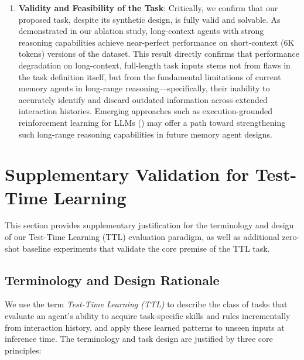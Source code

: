 \begin{enumerate}
    \item \textbf{Validity and Feasibility of the Task}: Critically, we confirm that our proposed task, despite its synthetic design, is fully valid and solvable. As demonstrated in our ablation study, long-context agents with strong reasoning capabilities achieve near-perfect performance on short-context (6K tokens) versions of the dataset. This result directly confirms that performance degradation on long-context, full-length task inputs stems not from flaws in the task definition itself, but from the fundamental limitations of current memory agents in long-range reasoning—specifically, their inability to accurately identify and discard outdated information across extended interaction histories. Emerging approaches such as execution-grounded reinforcement learning for LLMs (\cite{li2026boostapr}) may offer a path toward strengthening such long-range reasoning capabilities in future memory agent designs.


\end{enumerate}






\section{Supplementary Validation for Test-Time Learning}
\label{app:test_time_learning}

This section provides supplementary justification for the terminology and design of our Test-Time Learning (TTL) evaluation paradigm, as well as additional zero-shot baseline experiments that validate the core premise of the TTL task.

\subsection{Terminology and Design Rationale}
We use the term \textit{Test-Time Learning (TTL)} to describe the class of tasks that evaluate an agent's ability to acquire task-specific skills and rules incrementally from interaction history, and apply these learned patterns to unseen inputs at inference time. The terminology and task design are justified by three core principles:

